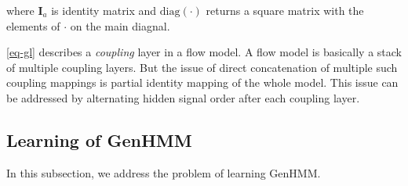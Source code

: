 \documentclass{ecai}
\begin{document}
where $\bm{I}_a$ is identity matrix and $\mathrm{diag}(\cdot)$ returns a square matrix with the elements of $\cdot$ on the main diagnal.

\eqref{eq-gl} describes a \textit{coupling} layer in a flow model. A flow model is basically a stack of multiple coupling layers. But the issue of direct concatenation of multiple such coupling mappings is partial identity mapping of the whole model. This issue can be addressed by alternating hidden signal order after each coupling layer.


\subsection{Learning of GenHMM}\label{subsec:optmGenHMM}
In this subsection, we address the problem of learning GenHMM.
\end{document}
